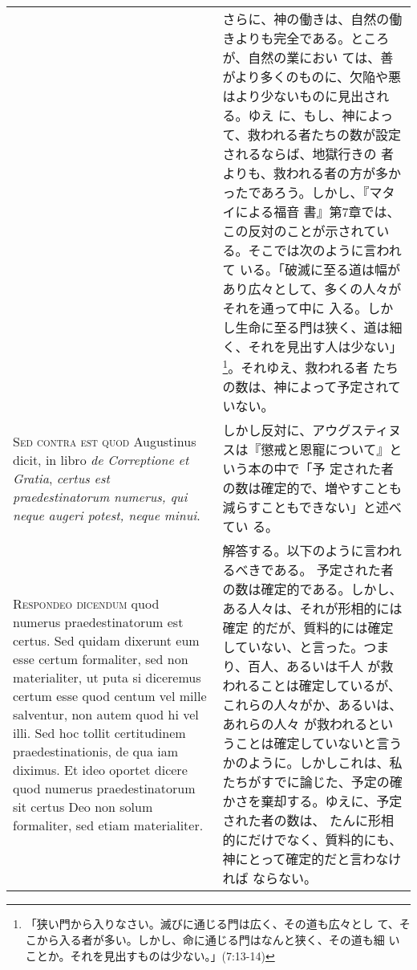 \documentclass[10pt]{jsarticle} %
\begin{document}
\begin{longtable}{p{21em}p{21em}}
&

さらに、神の働きは、自然の働きよりも完全である。ところが、自然の業におい
 ては、善がより多くのものに、欠陥や悪はより少ないものに見出される。ゆえ
 に、もし、神によって、救われる者たちの数が設定されるならば、地獄行きの
 者よりも、救われる者の方が多かったであろう。しかし、『マタイによる福音
 書』第7章では、この反対のことが示されている。そこでは次のように言われて
 いる。「破滅に至る道は幅があり広々として、多くの人々がそれを通って中に
 入る。しかし生命に至る門は狭く、道は細く、それを見出す人は少ない」
 \footnote{「狭い門から入りなさい。滅びに通じる門は広く、その道も広々とし
 て、そこから入る者が多い。しかし、命に通じる門はなんと狭く、その道も細
 いことか。それを見出すものは少ない。」(7:13-14)}。それゆえ、救われる者
 たちの数は、神によって予定されていない。




\\


{\scshape Sed contra est quod} Augustinus dicit, in
libro {\itshape de Correptione et Gratia}, {\itshape certus est praedestinatorum numerus, qui
neque augeri potest, neque minui}.


&

しかし反対に、アウグスティヌスは『懲戒と恩寵について』という本の中で「予
 定された者の数は確定的で、増やすことも減らすこともできない」と述べてい
 る。


\\


{\scshape Respondeo dicendum} quod numerus
praedestinatorum est certus. Sed quidam dixerunt eum esse certum
formaliter, sed non materialiter, ut puta si diceremus certum esse quod
centum vel mille salventur, non autem quod hi vel illi. Sed hoc tollit
certitudinem praedestinationis, de qua iam diximus. Et ideo oportet
dicere quod numerus praedestinatorum sit certus Deo non solum
formaliter, sed etiam materialiter. 


&


解答する。以下のように言われるべきである。
予定された者の数は確定的である。しかし、ある人々は、それが形相的には確定
 的だが、質料的には確定していない、と言った。つまり、百人、あるいは千人
 が救われることは確定しているが、これらの人々がか、あるいは、あれらの人々
 が救われるということは確定していないと言うかのように。しかしこれは、私
 たちがすでに論じた、予定の確かさを棄却する。ゆえに、予定された者の数は、
 たんに形相的にだけでなく、質料的にも、神にとって確定的だと言わなければ
 ならない。


\\


\end{longtable}
\end{document}
